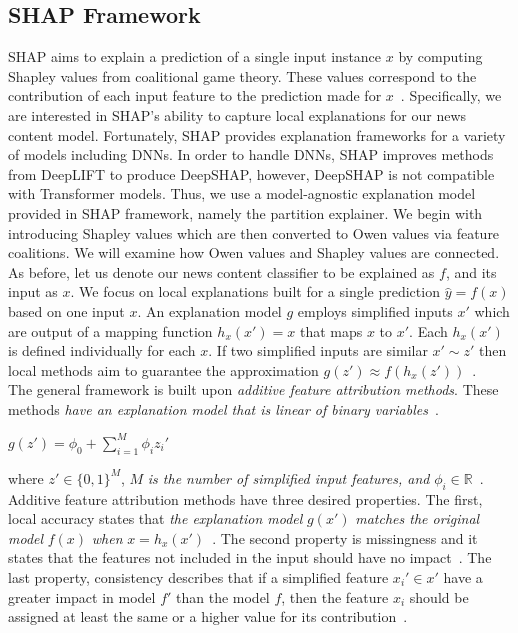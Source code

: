 \subsection{SHAP Framework}
\label{subsec:SHAPFramework}
SHAP aims to explain a prediction of a single input instance $x$ by computing Shapley values from coalitional game
theory. These values correspond to the contribution of each input feature to the prediction made for $x$~\parencite{InterpretableMachineLearning_Molnar}. Specifically, we are interested in SHAP's ability to capture local explanations
for our news content model. Fortunately, SHAP provides explanation frameworks for a variety of models including DNNs. In order to handle DNNs, SHAP improves methods from DeepLIFT to produce DeepSHAP, however, DeepSHAP is not compatible with Transformer models. Thus, we use a model-agnostic explanation model provided in SHAP framework, namely the partition explainer. We begin with introducing Shapley values which are then converted to Owen values via feature coalitions. We will examine how Owen values and Shapley values are connected.\\
As before, let us denote our news content classifier to be explained as $f$, and its input as $x$. We focus on local explanations built for a single prediction $\hat{y} = f(x)$ based on one input $x$. An explanation model $g$ employs simplified inputs $x'$ which are output of a mapping function $h_x(x') = x$ that maps $x$ to $x'$. Each $h_x(x')$ is defined individually for each $x$. If two simplified inputs are similar $x' \sim z'$ then local methods aim to guarantee the approximation $g(z') \approx f(h_x(z'))$~\parencite{AUnifiedApproach_Lundberg}.\\
The general framework is built upon \emph{additive feature attribution methods}. These methods \emph{have an explanation model that is linear of binary variables}~\parencite{AUnifiedApproach_Lundberg}.\\
\begin{center}
    $g(z') = \phi_0 + \sum\limits_{i=1}^M \phi_i z_i'$
\end{center}
where $z' \in \{0, 1\}^M$, $M$ \emph{is the number of simplified input features, and} $\phi_i \in \mathbb{R}$~\parencite{AUnifiedApproach_Lundberg}. Additive feature attribution methods have three desired properties. The first, local accuracy states that \emph{the explanation model} $g(x')$ \emph{matches the original model} $f(x)$ \emph{when} $x = h_x(x')$~\parencite{AUnifiedApproach_Lundberg}. The second property is missingness and it states that the features not included in the input should have no impact~\parencite{AUnifiedApproach_Lundberg}. The last property, consistency describes that if a simplified feature $x_i' \in x'$ have a greater impact in model $f'$ than the model $f$, then the feature $x_i$ should be assigned at least the same or a higher value for its contribution~\parencite{AUnifiedApproach_Lundberg}. \\
